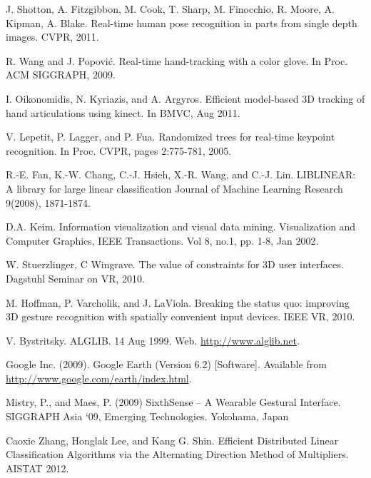 \documentclass[letterpaper,twocolumn,10pt]{article}
\begin{document}
\vspace*{-0.3in}

\vspace*{-0.3in}

\vspace*{-0.3in}

\vspace*{-0.3in}

\vspace*{-0.3in}

\vspace*{-0.3in}

\vspace*{-0.3in}

\vspace*{-0.3in}

\vspace*{-0.3in}

\vspace*{-0.3in}

\begin{thebibliography}{9}

 J. Shotton, A. Fitzgibbon, M. Cook, T. Sharp, M. Finocchio, R. Moore, A. Kipman, A. Blake. Real-time human pose recognition in parts from single depth images. CVPR, 2011.

 R. Wang and J. Popovi\'c. Real-time hand-tracking with a color glove. In Proc. ACM SIGGRAPH, 2009.

 I. Oikonomidis, N. Kyriazis, and A. Argyros. Efficient model-based 3D tracking of hand articulations using kinect. In BMVC, Aug 2011.

 V. Lepetit, P. Lagger, and P. Fua. Randomized trees for real-time keypoint recognition. In Proc. CVPR, pages 2:775-781, 2005. 

 R.-E. Fan, K.-W. Chang, C.-J. Hsieh, X.-R. Wang, and C.-J. Lin. LIBLINEAR: A library for large linear classification Journal of Machine Learning Research 9(2008), 1871-1874.

 D.A. Keim. Information visualization and visual data mining. Visualization and Computer Graphics, IEEE Transactions. Vol 8, no.1, pp. 1-8, Jan 2002.

 W. Stuerzlinger, C Wingrave. The value of constraints for 3D user interfaces. Dagstuhl Seminar on VR, 2010.

 M. Hoffman, P. Varcholik, and J. LaViola. Breaking the status quo: improving 3D gesture recognition with spatially convenient input devices. IEEE VR, 2010.

 V. Bystritsky. ALGLIB. 14 Aug 1999. Web. \url{http://www.alglib.net}.

 Google Inc. (2009). Google Earth (Version 6.2) [Software]. Available from \url{http://www.google.com/earth/index.html}.

 Mistry, P., and Maes, P. (2009) SixthSense – A Wearable Gestural Interface. SIGGRAPH Asia ‘09, Emerging Technologies. Yokohama, Japan

 Caoxie Zhang, Honglak Lee, and Kang G. Shin.  Efficient Distributed Linear Classification Algorithms via the Alternating Direction Method of Multipliers. AISTAT 2012.

\end{thebibliography}
\end{document}
